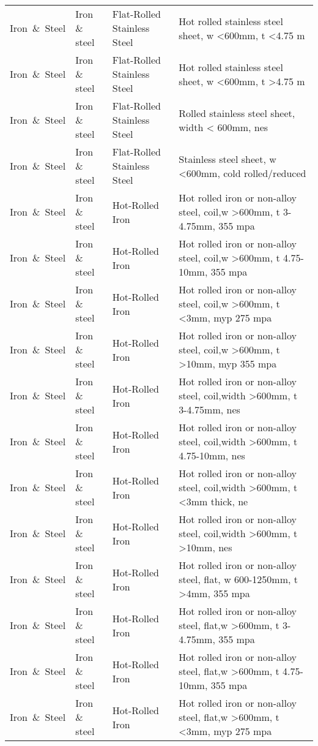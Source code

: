\begin{appendices}
\begin{xltabular}{\textwidth}{|p{0.07\textwidth}|p{0.12\textwidth}|p{0.20\textwidth}|p{0.5\textwidth}|}
Iron\ \&\ Steel & Iron \& steel & Flat-Rolled Stainless Steel & Hot rolled stainless steel sheet, w <600mm, t <4.75 m \\
Iron\ \&\ Steel & Iron \& steel & Flat-Rolled Stainless Steel & Hot rolled stainless steel sheet, w <600mm, t >4.75 m \\
Iron\ \&\ Steel & Iron \& steel & Flat-Rolled Stainless Steel & Rolled stainless steel sheet, width < 600mm, nes \\
Iron\ \&\ Steel & Iron \& steel & Flat-Rolled Stainless Steel & Stainless steel sheet, w <600mm, cold rolled/reduced \\
Iron\ \&\ Steel & Iron \& steel & Hot-Rolled Iron & Hot rolled iron or non-alloy steel, coil,w >600mm, t 3-4.75mm, 355 mpa \\
Iron\ \&\ Steel & Iron \& steel & Hot-Rolled Iron & Hot rolled iron or non-alloy steel, coil,w >600mm, t 4.75-10mm, 355 mpa \\
Iron\ \&\ Steel & Iron \& steel & Hot-Rolled Iron & Hot rolled iron or non-alloy steel, coil,w >600mm, t <3mm, myp 275 mpa \\
Iron\ \&\ Steel & Iron \& steel & Hot-Rolled Iron & Hot rolled iron or non-alloy steel, coil,w >600mm, t >10mm, myp 355 mpa \\
Iron\ \&\ Steel & Iron \& steel & Hot-Rolled Iron & Hot rolled iron or non-alloy steel, coil,width >600mm, t 3-4.75mm, nes \\
Iron\ \&\ Steel & Iron \& steel & Hot-Rolled Iron & Hot rolled iron or non-alloy steel, coil,width >600mm, t 4.75-10mm, nes \\
Iron\ \&\ Steel & Iron \& steel & Hot-Rolled Iron & Hot rolled iron or non-alloy steel, coil,width >600mm, t <3mm thick, ne \\
Iron\ \&\ Steel & Iron \& steel & Hot-Rolled Iron & Hot rolled iron or non-alloy steel, coil,width >600mm, t >10mm, nes \\
Iron\ \&\ Steel & Iron \& steel & Hot-Rolled Iron & Hot rolled iron or non-alloy steel, flat, w 600-1250mm, t >4mm, 355 mpa \\
Iron\ \&\ Steel & Iron \& steel & Hot-Rolled Iron & Hot rolled iron or non-alloy steel, flat,w >600mm, t 3-4.75mm, 355 mpa \\
Iron\ \&\ Steel & Iron \& steel & Hot-Rolled Iron & Hot rolled iron or non-alloy steel, flat,w >600mm, t 4.75-10mm, 355 mpa \\
Iron\ \&\ Steel & Iron \& steel & Hot-Rolled Iron & Hot rolled iron or non-alloy steel, flat,w >600mm, t <3mm, myp 275 mpa \\

\end{xltabular}
\end{appendices}
